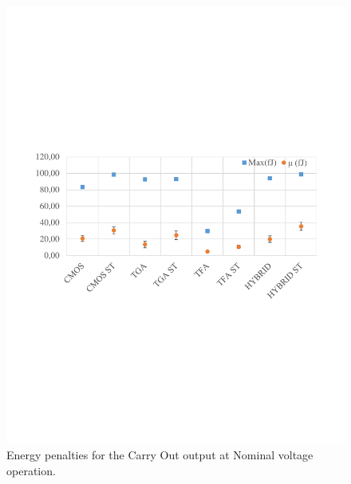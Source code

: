 \documentclass[ecp,tc, english]{iiufrgs}
\begin{document}
\begin{figure}[H]
\centering
\includegraphics[width=\textwidth, trim={0 9cm 0 9cm},clip]{energyNominalCarryOut.pdf}
\caption{Energy penalties for the Carry Out output at Nominal voltage operation.}
\label{fig:energyNCO}
\end{figure}
\end{document}
